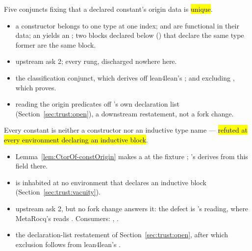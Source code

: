 \begin{assumption}
\label{asm:UpstreamAsks-constsOrigin}
\leanok
{}
\stAssumed{}  Five conjuncts fixing that a declared constant's origin data is
\hl{unique}.
\begin{itemize}
\item {} a constructor belongs to one type at one index;  and
 are functional in their data; an  yields an
; two blocks declared below  () that declare the
same type former are the same block.
\item {} upstream ask 2;  every rung, discharged nowhere here.
\item {} the classification conjunct, which 
derives off lean4lean's ; and  excluding
, which  proves.
\item {} reading the origin predicates off 's own
declaration list (Section~\ref{sec:trust:open}), a downstream restatement, not a fork change.
\end{itemize}
\end{assumption}

\begin{assumption}
\label{asm:UpstreamAsks-constOriginExcludes}
\leanok
{}
\stOpen{}  Every  constant is neither a constructor nor an
inductive type name --- \hl{refuted at every environment declaring an inductive block}.
\begin{itemize}
\item {} Lemma~\ref{lem:CtorOf-constOrigin} makes  a
 at the fixture ; 's
 derives  from this field there.
\item {}  is inhabited at no environment that declares an
inductive block (Section~\ref{sec:trust:vacuity}).
\item {} upstream ask 2, but no fork change answers it: the defect is
's reading, where MetaRocq's  reads
. Consumers: , .
\item {} the declaration-list restatement of
Section~\ref{sec:trust:open}, after which exclusion follows from lean4lean's
.
\end{itemize}
\end{assumption}

